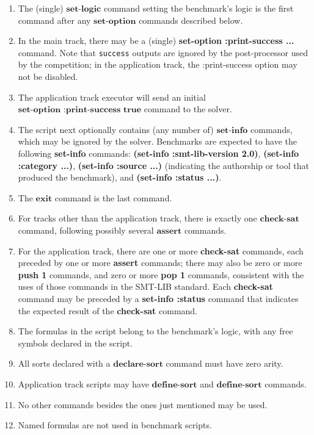 \documentclass[12pt]{article}
\newcommand{\akey}[1]{\textbf{#1}}
\begin{document}
\begin{enumerate}
\item The (single) $\akey{set-logic}$ command setting the benchmark's
logic is the first command after any $\akey{set-option}$ commands described below.
\item In the main track, there may be a (single) \akey{set-option :print-success ...} command. Note that {\tt success} outputs are ignored by the post-processor used by the competition; in 
the application track, the :print-success option may not be disabled.
\item The application track executor will send an initial $\akey{set-option :print-success true}$ command to the solver. 
\item The script next optionally contains (any number of) $\akey{set-info}$ commands, which may be ignored by the solver. Benchmarks are expected to have the following \akey{set-info} commands: \akey{(set-info :smt-lib-version 2.0)}, \akey{(set-info :category ...)}, \akey{(set-info :source ...)} (indicating the authorship or tool that produced the benchmark), and \akey{(set-info :status ...)}.
\item The $\akey{exit}$ command is the last command.
\item For tracks other than the application track, there is exactly one $\akey{check-sat}$ command,
following possibly several $\akey{assert}$ commands.
\item For the application track, there are one or more \akey{check-sat} commands, 
  each preceded by one or more \akey{assert} commands; 
  there may also be zero or more \akey{push 1} commands, 
  and zero or more \akey{pop 1} commands, consistent with the uses of those commands in
  the SMT-LIB standard. Each \akey{check-sat} command may be preceded by a \akey{set-info :status} command that indicates the expected result of the 
  \akey{check-sat} command.

\item The formulas in the script belong to the benchmark's logic, with
any free symbols declared in the script.
\item All sorts declared with a $\akey{declare-sort}$ command must have zero arity.

\item Application track scripts may have $\akey{define-sort}$ and $\akey{define-sort}$ commands. 
\item No other commands besides the ones just mentioned may be used.
\item Named formulas are not used in benchmark scripts.

\end{enumerate}
\end{document}
